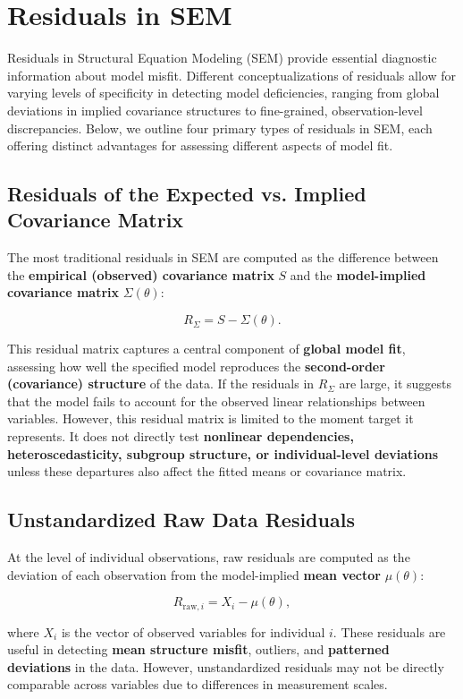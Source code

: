 \documentclass[floatsintext,a4paper]{apa7} %
\begin{document}
	\section{Residuals in SEM}
	
	Residuals in Structural Equation Modeling (SEM) provide essential diagnostic information about model misfit. Different conceptualizations of residuals allow for varying levels of specificity in detecting model deficiencies, ranging from global deviations in implied covariance structures to fine-grained, observation-level discrepancies. Below, we outline four primary types of residuals in SEM, each offering distinct advantages for assessing different aspects of model fit.
	
	\subsection{Residuals of the Expected vs. Implied Covariance Matrix}
	The most traditional residuals in SEM are computed as the difference between the \textbf{empirical (observed) covariance matrix} $ S $ and the \textbf{model-implied covariance matrix} $ \Sigma(\theta) $:
	
	$$
	R_{\Sigma} = S - \Sigma(\theta).
	$$
	
	This residual matrix captures a central component of \textbf{global model fit}, assessing how well the specified model reproduces the \textbf{second-order (covariance) structure} of the data. If the residuals in $ R_{\Sigma} $ are large, it suggests that the model fails to account for the observed linear relationships between variables. However, this residual matrix is limited to the moment target it represents. It does not directly test \textbf{nonlinear dependencies, heteroscedasticity, subgroup structure, or individual-level deviations} unless these departures also affect the fitted means or covariance matrix.
	
	\subsection{Unstandardized Raw Data Residuals}
	At the level of individual observations, raw residuals are computed as the deviation of each observation from the model-implied \textbf{mean vector} $ \mu(\theta) $:
	
	$$
	R_{\text{raw},i} = X_i - \mu(\theta),
	$$
	
	where $ X_i $ is the vector of observed variables for individual $ i $. These residuals are useful in detecting \textbf{mean structure misfit}, outliers, and \textbf{patterned deviations} in the data. However, unstandardized residuals may not be directly comparable across variables due to differences in measurement scales.
	
\end{document}
